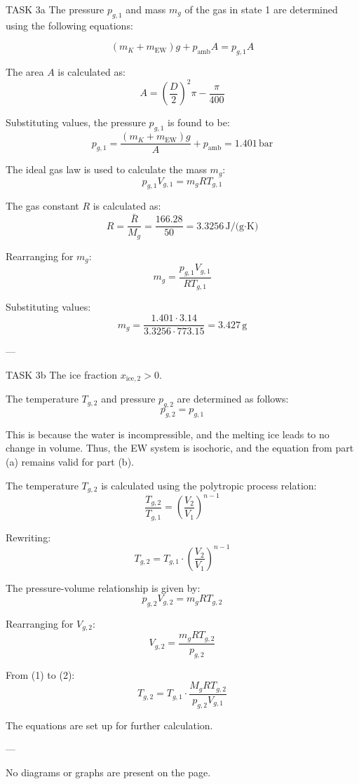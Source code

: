 TASK 3a  
The pressure \( p_{g,1} \) and mass \( m_g \) of the gas in state 1 are determined using the following equations:  

\[
(m_K + m_{\text{EW}}) g + p_{\text{amb}} A = p_{g,1} A
\]

The area \( A \) is calculated as:  
\[
A = \left(\frac{D}{2}\right)^2 \pi - \frac{\pi}{400}
\]

Substituting values, the pressure \( p_{g,1} \) is found to be:  
\[
p_{g,1} = \frac{(m_K + m_{\text{EW}}) g}{A} + p_{\text{amb}} = 1.401 \, \text{bar}
\]

The ideal gas law is used to calculate the mass \( m_g \):  
\[
p_{g,1} V_{g,1} = m_g R T_{g,1}
\]

The gas constant \( R \) is calculated as:  
\[
R = \frac{\bar{R}}{M_g} = \frac{166.28}{50} = 3.3256 \, \text{J/(g·K)}
\]

Rearranging for \( m_g \):  
\[
m_g = \frac{p_{g,1} V_{g,1}}{R T_{g,1}}
\]

Substituting values:  
\[
m_g = \frac{1.401 \cdot 3.14}{3.3256 \cdot 773.15} = 3.427 \, \text{g}
\]

---

TASK 3b  
The ice fraction \( x_{\text{ice},2} > 0 \).  

The temperature \( T_{g,2} \) and pressure \( p_{g,2} \) are determined as follows:  
\[
p_{g,2} = p_{g,1}
\]

This is because the water is incompressible, and the melting ice leads to no change in volume. Thus, the EW system is isochoric, and the equation from part (a) remains valid for part (b).  

The temperature \( T_{g,2} \) is calculated using the polytropic process relation:  
\[
\frac{T_{g,2}}{T_{g,1}} = \left(\frac{V_2}{V_1}\right)^{n-1}
\]

Rewriting:  
\[
T_{g,2} = T_{g,1} \cdot \left(\frac{V_2}{V_1}\right)^{n-1}
\]

The pressure-volume relationship is given by:  
\[
p_{g,2} V_{g,2} = m_g R T_{g,2}
\]

Rearranging for \( V_{g,2} \):  
\[
V_{g,2} = \frac{m_g R T_{g,2}}{p_{g,2}}
\]

From (1) to (2):  
\[
T_{g,2} = T_{g,1} \cdot \frac{M_g R T_{g,2}}{p_{g,2} V_{g,1}}
\]  

The equations are set up for further calculation.  

---

No diagrams or graphs are present on the page.